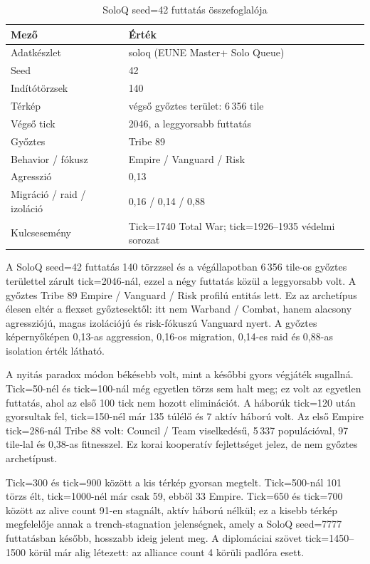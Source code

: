 ﻿\documentclass[a4paper,12pt]{report}
\begin{document}
\begin{table}[h]
\centering
\caption{SoloQ seed=42 futtatás összefoglalója}
\label{tab:neurosim-run-sq42-summary}
\begin{tabular}{ll}
\hline
\textbf{Mező} & \textbf{Érték} \\
\hline
Adatkészlet & soloq (EUNE Master+ Solo Queue) \\
Seed & 42 \\
Indítótörzsek & 140 \\
Térkép & végső győztes terület: 6\,356 tile \\
Végső tick & 2046, a leggyorsabb futtatás \\
Győztes & Tribe 89 \\
Behavior / fókusz & Empire / Vanguard / Risk \\
Agresszió & 0,13 \\
Migráció / raid / izoláció & 0,16 / 0,14 / 0,88 \\
Kulcsesemény & Tick=1740 Total War; tick=1926--1935 védelmi sorozat \\
\hline
\end{tabular}
\end{table}

A SoloQ seed=42 futtatás 140 törzzsel és a végállapotban 6\,356 tile-os győztes területtel zárult tick=2046-nál, ezzel a négy futtatás közül a leggyorsabb volt. A győztes Tribe 89 Empire / Vanguard / Risk profilú entitás lett. Ez az archetípus élesen eltér a flexset győztesektől: itt nem Warband / Combat, hanem alacsony agressziójú, magas izolációjú és risk-fókuszú Vanguard nyert. A győztes képernyőképen 0,13-as aggression, 0,16-os migration, 0,14-es raid és 0,88-as isolation érték látható.

A nyitás paradox módon békésebb volt, mint a későbbi gyors végjáték sugallná. Tick=50-nél és tick=100-nál még egyetlen törzs sem halt meg; ez volt az egyetlen futtatás, ahol az első 100 tick nem hozott eliminációt. A háborúk tick=120 után gyorsultak fel, tick=150-nél már 135 túlélő és 7 aktív háború volt. Az első Empire tick=286-nál Tribe 88 volt: Council / Team viselkedésű, 5\,337 populációval, 97 tile-lal és 0,38-as fitnesszel. Ez korai kooperatív fejlettséget jelez, de nem győztes archetípust.

Tick=300 és tick=900 között a kis térkép gyorsan megtelt. Tick=500-nál 101 törzs élt, tick=1000-nél már csak 59, ebből 33 Empire. Tick=650 és tick=700 között az alive count 91-en stagnált, aktív háború nélkül; ez a kisebb térkép megfelelője annak a trench-stagnation jelenségnek, amely a SoloQ seed=7777 futtatásban később, hosszabb ideig jelent meg. A diplomáciai szövet tick=1450--1500 körül már alig létezett: az alliance count 4 körüli padlóra esett.
\end{document}
